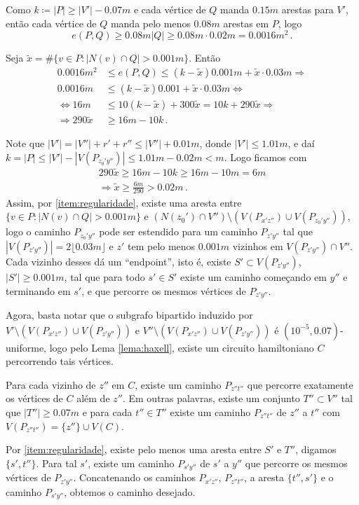 \begin{dem}
	Como $k\coloneqq |P|\geq |V'| - 0.07m$ e cada vértice de $Q$ manda $0.15m$ arestas para $V'$, então cada vértice de $Q$ manda pelo menos $0.08m$ arestas em $P$, logo
	\[
		e(P,Q)\geq0.08m|Q|\geq0.08m\cdot0.02m = 0.0016m^2\,.
	\]
	
	Seja $\tilde{x} = \#\{v\in P: |N(v)\cap Q|>0.001m\}$. Então 
	\begin{align*}
		0.0016m^2&\leq  e(P,Q)\leq (k-\tilde{x})0.001m + \tilde{x}\cdot 0.03m\Longrightarrow \\
		0.0016m&\leq (k-\tilde{x})0.001 + \tilde{x}\cdot 0.03m\Longleftrightarrow \\
		\Longleftrightarrow 16m&\leq 10(k-\tilde{x}) + 300\tilde{x} = 10k + 290\tilde{x}\Longrightarrow \\
		\Longrightarrow 290\tilde{x}&\geq 16m - 10k\,.
	\end{align*}
	
	Note que $|V'| = |V''| + r' + r''\leq |V''| + 0.01m$, donde $|V'|\leq1.01m$, e daí $k = |P|\leq |V'| - |V(P_{z_0'y''})|\leq1.01m - 0.02m < m$. Logo ficamos com 
	\begin{gather*}
		290\tilde{x}\geq16m - 10k\geq16m - 10m = 6m \\
		\Longrightarrow \tilde{x}\geq \frac{6m}{290} > 0.02m\,.
	\end{gather*}
	Assim, por \ref{item:regularidade}, existe uma aresta entre $\{v\in P: |N(v)\cap Q|>0.001m\}$ e $(N(z_0')\cap V'')\setminus(V(P_{x'z''})\cup V(P_{z_0'y''}))$, logo o caminho $P_{z_0'y''}$ pode ser estendido para um caminho $P_{z'y''}$ tal que $|V(P_{z'y''})| = 2\lfloor0.03m\rfloor$ e $z'$ tem pelo menos $0.001m$ vizinhos em $V(P_{z'y''})\cap V''$. Cada vizinho desses dá um ``endpoint'', isto é, existe $S'\subset V(P_{z'y''})$, $|S'|\geq0.001m$, tal que para todo $s'\in S'$ existe um caminho começando em $y''$ e terminando em $s'$, e que percorre os mesmos vértices de $P_{z'y''}$.
	
	Agora, basta notar que o subgrafo bipartido induzido por $V'\setminus(V(P_{x'z''})\cup V(P_{z'y''}))$ e $V''\setminus(V(P_{x'z''})\cup V(P_{z'y''}))$ é $(10^{-5}, 0.07)$-uniforme, logo pelo Lema \ref{lema:haxell}, existe um circuito hamiltoniano $C$ percorrendo tais vértices.
	
	Para cada vizinho de $z''$ em $C$, existe um caminho $P_{z''t''}$ que percorre exatamente os vértices de $C$ além de $z''$. Em outras palavras, existe um conjunto $T''\subset V''$ tal que $|T''|\geq0.07m$ e para cada $t''\in T''$ existe um caminho $P_{z''t''}$ de $z''$ a $t''$ com $V(P_{z''t''}) = \{z''\}\cup V(C)$.
	
	Por \ref{item:regularidade}, existe pelo menos uma aresta entre $S'$ e $T''$, digamos $\{s', t''\}$. Para tal $s'$, existe um caminho $P_{s'y''}$ de $s'$ a $y''$ que percorre os mesmos vértices de $P_{z'y''}$. Concatenando os caminhos $P_{x'z''}$, $P_{z''t''}$, a aresta $\{t'', s'\}$ e o caminho $P_{s'y''}$, obtemos o caminho desejado.
	
\end{dem}

